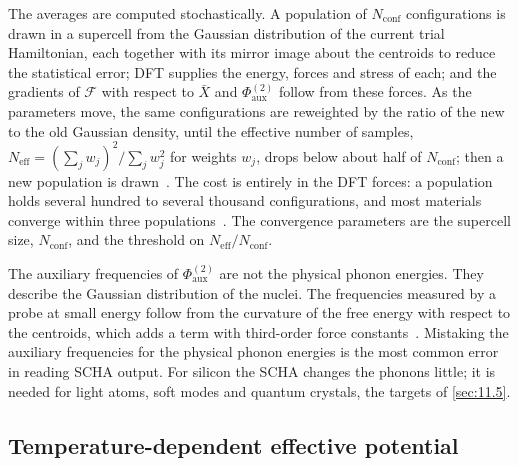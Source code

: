 The averages are computed stochastically. A population of $N_{\mathrm{conf}}$ configurations is drawn in a supercell from the Gaussian distribution of the current trial Hamiltonian, each together with its mirror image about the centroids to reduce the statistical error; DFT supplies the energy, forces and stress of each; and the gradients of $\mathcal{F}$ with respect to $\bar X$ and $\Phi^{(2)}_{\mathrm{aux}}$ follow from these forces. As the parameters move, the same configurations are reweighted by the ratio of the new to the old Gaussian density, until the effective number of samples, $N_{\mathrm{eff}} = (\sum_jw_j)^2/\sum_jw_j^2$ for weights $w_j$, drops below about half of $N_{\mathrm{conf}}$; then a new population is drawn~\cite[Eqs.~(21), (38) and~(39)]{monacelli2021stochastic}. The cost is entirely in the DFT forces: a population holds several hundred to several thousand configurations, and most materials converge within three populations~\cite[Sect.~III\,B]{monacelli2021stochastic}. The convergence parameters are the supercell size, $N_{\mathrm{conf}}$, and the threshold on $N_{\mathrm{eff}}/N_{\mathrm{conf}}$.

The auxiliary frequencies of $\Phi^{(2)}_{\mathrm{aux}}$ are not the physical phonon energies. They describe the Gaussian distribution of the nuclei. The frequencies measured by a probe at small energy follow from the curvature of the free energy with respect to the centroids, which adds a term with third-order force constants~\cite[Sect.~IV]{monacelli2021stochastic}. Mistaking the auxiliary frequencies for the physical phonon energies is the most common error in reading SCHA output. For silicon the SCHA changes the phonons little; it is needed for light atoms, soft modes and quantum crystals, the targets of \cref{sec:11.5}.

\subsection{Temperature-dependent effective potential}

